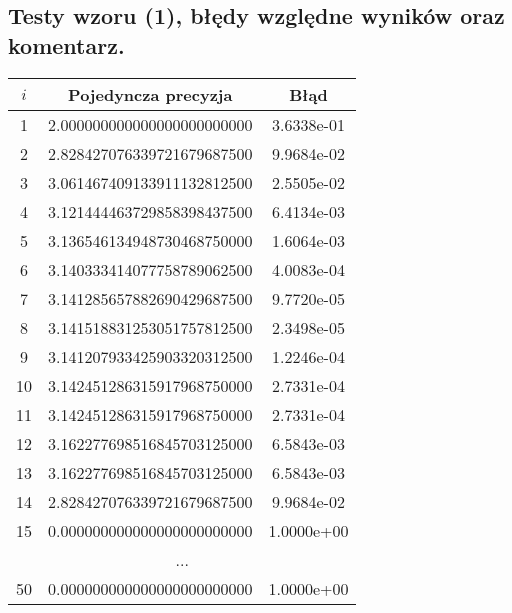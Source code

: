 \documentclass[10pt,wide]{mwart}
\theoremstyle{definition}
\begin{document}
\subsection{Testy wzoru (1), błędy względne wyników oraz komentarz.}
\begin{minipage}[t]{0.5\textwidth}
  \begin{tabular}{|c|c|c|} \hline
    \(i\) & Pojedyncza precyzja & Błąd \\ \hline
    1 & 2.000000000000000000000000 & 3.6338e-01 \\ \hline
    2 & 2.828427076339721679687500 & 9.9684e-02 \\ \hline
    3 & 3.061467409133911132812500 & 2.5505e-02 \\ \hline
    4 & 3.121444463729858398437500 & 6.4134e-03 \\ \hline
    5 & 3.136546134948730468750000 & 1.6064e-03 \\ \hline
    6 & 3.140333414077758789062500 & 4.0083e-04 \\ \hline
    7 & 3.141285657882690429687500 & 9.7720e-05 \\ \hline
    8 & 3.141518831253051757812500 & 2.3498e-05 \\ \hline
    9 & 3.141207933425903320312500 & 1.2246e-04 \\ \hline
    10 & 3.142451286315917968750000 & 2.7331e-04 \\ \hline
    11 & 3.142451286315917968750000 & 2.7331e-04 \\ \hline
    12 & 3.162277698516845703125000 & 6.5843e-03 \\ \hline
    13 & 3.162277698516845703125000 & 6.5843e-03 \\ \hline
    14 & 2.828427076339721679687500 & 9.9684e-02 \\ \hline
    15 & 0.000000000000000000000000 & 1.0000e+00 \\ \hline
    \multicolumn{3}{|c|}{...} \\ \hline
    50 & 0.000000000000000000000000 & 1.0000e+00 \\ \hline
  \end{tabular}
\end{minipage}
\end{document}
